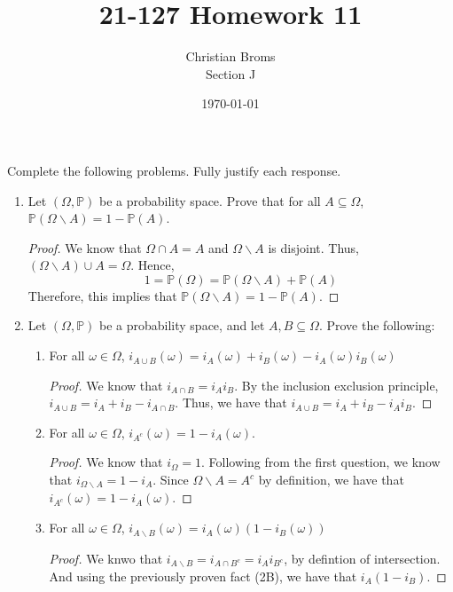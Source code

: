 \documentclass[12pt]{article}
\newcommand{\ba}{\backslash}
\renewcommand{\P}{\mathbb{P}}
\newcommand{\p}[1]{\P\left(#1\right)}
\begin{document}
\title{21-127 Homework 11
}
\author{Christian Broms \\ Section J}
\date{\today}
\maketitle
Complete the following problems. Fully justify each response.


\begin{enumerate}

\item Let $(\Omega, \P)$ be a probability space. Prove that for all $A\subseteq \Omega$, $\p{\Omega\ba A} = 1-\p{A}$.

\begin{proof}
We know that $\Omega \cap A = A$ and $\Omega \ba A$ is disjoint. Thus, $(\Omega \ba A) \cup A = \Omega $. Hence, $$ 1 = \p{\Omega} = \p{\Omega \ba A } + \p{A}$$
Therefore, this implies that $\p{\Omega \ba A} = 1 - \p{A}$.  
\end{proof}

\item Let $(\Omega, \P)$ be a probability space, and let $A, B\subseteq \Omega$. Prove the following:
\begin{enumerate}
\item For all $\omega\in\Omega$, $i_{A\cup B}(\omega) = i_{A}(\omega)+i_{B}(\omega)-i_{A}(\omega)i_{B}(\omega)$

\begin{proof}
We know that $i_{A\cap B} = i_Ai_B$. By the inclusion exclusion principle, $i_{A\cup B} = i_A + i_B - i_{A \cap B}$. Thus, we have that $i_{A\cup B} = i_A + i_B - i_Ai_B$.  
\end{proof}
\item For all $\omega\in\Omega$, $i_{A^c}(\omega) = 1-i_A(\omega)$.

\begin{proof}
We know that $i_{\Omega} = 1$. Following from the first question, we know that $i_{\Omega \ba A} = 1 - i_A$. Since $\Omega \ba A = A^c$ by definition, we have that $i_{A^c}(\omega) = 1-i_A(\omega)$.
\end{proof}
\item For all $\omega\in\Omega$, $i_{A\ba B}(\omega) = i_A(\omega)(1-i_B(\omega))$
\begin{proof}
We knwo that $i_{A\ba B} = i_{A \cap B^c} = i_Ai_{B^c}$, by defintion of intersection. And using the previously proven fact (2B), we have that $i_A(1- i_B)$. 
\end{proof}
\end{enumerate}


\end{enumerate}
\end{document}
